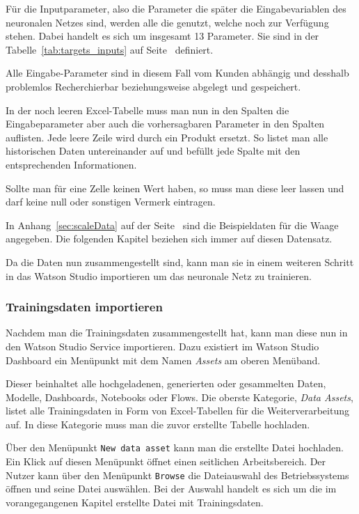Für die Inputparameter, also die Parameter die später die Eingabevariablen des neuronalen Netzes sind, werden alle die
genutzt, welche noch zur Verfügung stehen. Dabei handelt es sich um insgesamt 13 Parameter. Sie sind in der
Tabelle~\ref{tab:targets_inputs} auf Seite~\pageref{tab:targets_inputs} definiert.

Alle Eingabe-Parameter sind in diesem Fall vom Kunden abhängig und desshalb problemlos Recherchierbar beziehungsweise
abgelegt und gespeichert.

In der noch leeren Excel-Tabelle muss man nun in den Spalten die Eingabeparameter aber auch die vorhersagbaren Parameter
in den Spalten auflisten. Jede leere Zeile wird durch ein Produkt ersetzt. So listet man alle historischen Daten
untereinander auf und befüllt jede Spalte mit den entsprechenden Informationen.

Sollte man für eine Zelle keinen Wert haben, so muss man diese leer lassen und darf keine null oder sonstigen Vermerk
eintragen.

In Anhang~\ref{sec:scaleData} auf der Seite~\pageref{sec:scaleData} sind die Beispieldaten für die Waage angegeben. Die
folgenden Kapitel beziehen sich immer auf diesen Datensatz.

Da die Daten nun zusammengestellt sind, kann man sie in einem weiteren Schritt in das Watson Studio importieren um das
neuronale Netz zu trainieren.

\subsubsection{Trainingsdaten importieren}
Nachdem man die Trainingsdaten zusammengestellt hat, kann man diese nun in den Watson Studio Service importieren. Dazu
existiert im Watson Studio Dashboard ein Menüpunkt mit dem Namen \textit{Assets} am oberen Menüband.

Dieser beinhaltet alle hochgeladenen, generierten oder gesammelten Daten, Modelle, Dashboards, Notebooks oder Flows. Die
oberste Kategorie, \textit{Data Assets}, listet alle Trainingsdaten in Form von Excel-Tabellen für die
Weiterverarbeitung auf. In diese Kategorie muss man die zuvor erstellte Tabelle hochladen.

Über den Menüpunkt \texttt{New data asset} kann man die erstellte Datei hochladen. Ein Klick auf diesen Menüpunkt öffnet
einen seitlichen Arbeitsbereich. Der Nutzer kann über den Menüpunkt \texttt{Browse} die Dateiauswahl des Betriebssystems
öffnen und seine Datei auswählen. Bei der Auswahl handelt es sich um die im vorangegangenen Kapitel erstellte Datei mit
Trainingsdaten.


